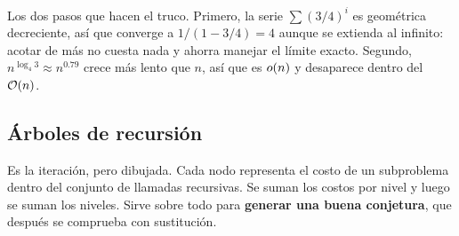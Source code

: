 \documentclass[11pt,letterpaper]{article}
\begin{document}
\begin{idea}
  Los dos pasos que hacen el truco. Primero, la serie
  $\sum (3/4)^i$ es geométrica decreciente, así que converge a
  $1/(1 - 3/4) = 4$ aunque se extienda al infinito: acotar de más no
  cuesta nada y ahorra manejar el límite exacto. Segundo,
  $n^{\log_4 3} \approx n^{0.79}$ crece más lento que $n$, así que es
  $o\!\left(n\right)$ y desaparece dentro del $\mathcal{O}\!\left(n\right)$.
\end{idea}


\subsection*{Árboles de recursión}

Es la iteración, pero dibujada. Cada nodo representa el costo de un
subproblema dentro del conjunto de llamadas recursivas. Se suman los
costos por nivel y luego se suman los niveles. Sirve sobre todo para
\textbf{generar una buena conjetura}, que después se comprueba con
sustitución.
\end{document}
